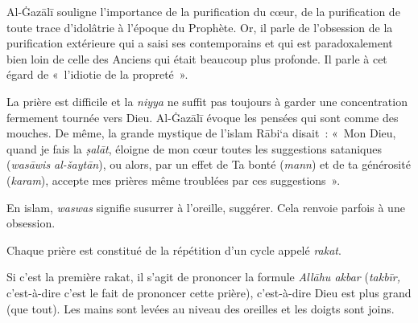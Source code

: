 Al-Ġazālī \label{theol:AlGazali12} souligne l'importance de la purification du cœur, de la
purification de toute trace d'idolâtrie à l'époque du Prophète. Or, il
parle de l'obsession de la purification extérieure qui a saisi ses
contemporains et qui est paradoxalement bien loin de celle des Anciens
qui était beaucoup plus profonde. Il parle à cet égard de «~l'idiotie de
la propreté~».

La prière est difficile et la \emph{niyya} ne suffit pas toujours à
garder une concentration fermement tournée vers Dieu. Al-Ġazālī \label{theol:AlGazali13} évoque
les pensées qui sont comme des mouches. De même, la grande mystique de
l'islam Rābi`a disait~: «~Mon Dieu, quand je fais la \emph{ṣalāt},
éloigne de mon cœur toutes les suggestions sataniques (\emph{wasāwis
al-šaytān}), ou alors, par un effet de Ta bonté (\emph{mann}) et de ta
générosité (\emph{karam}), accepte mes prières même troublées par ces
suggestions~».

En islam, \emph{waswas} signifie susurrer à l'oreille, suggérer. Cela
renvoie parfois à une obsession.


Chaque prière est constitué de la répétition d'un cycle appelé
\emph{rakat}.

Si c'est la première rakat, il s'agit de prononcer la formule
\emph{Allāhu akbar} (\emph{takbīr,} c'est-à-dire c'est le fait de
prononcer cette prière), c'est-à-dire Dieu est plus grand (que tout).
Les mains sont levées au niveau des oreilles et les doigts sont joins.


